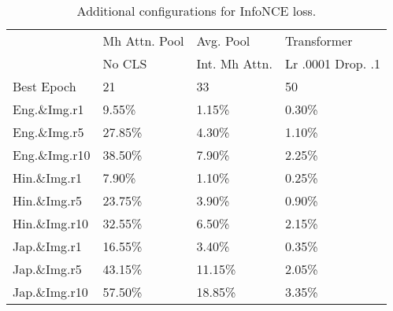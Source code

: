 \begin{table}
    \centering
\begin{tabular}{llll}
\toprule
{} & Mh Attn. Pool & Avg. Pool & Transformer \\
{} & No CLS & Int. Mh Attn. & Lr .0001 Drop. .1 \\
\midrule
Best Epoch          &                           21 &                  33 &                       50 \\
Eng.\&Img.r1  &                        9.55\% &               1.15\% &                    0.30\% \\
Eng.\&Img.r5  &                       27.85\% &               4.30\% &                    1.10\% \\
Eng.\&Img.r10 &                       38.50\% &               7.90\% &                    2.25\% \\
\midrule
Hin.\&Img.r1  &                        7.90\% &               1.10\% &                    0.25\% \\
Hin.\&Img.r5  &                       23.75\% &               3.90\% &                    0.90\% \\
Hin.\&Img.r10 &                       32.55\% &               6.50\% &                    2.15\% \\
\midrule
Jap.\&Img.r1  &                       16.55\% &               3.40\% &                    0.35\% \\
Jap.\&Img.r5  &                       43.15\% &              11.15\% &                    2.05\% \\
Jap.\&Img.r10 &                       57.50\% &              18.85\% &                    3.35\% \\
\bottomrule
\end{tabular}
\caption{Additional configurations for InfoNCE loss.}
\label{table:additional_obj_configs}
\end{table}
